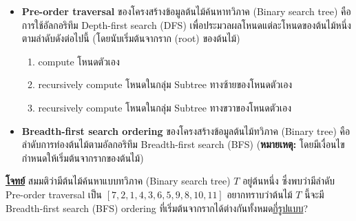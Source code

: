 \begin{itemize}
    \item \textbf{Pre-order traversal}
    ของโครงสร้างข้อมูลต้นไม้ค้นหาทวิภาค (Binary search tree) คือการใช้อัลกอริทึม 
    Depth-first search (DFS) เพื่อประมวลผลโหนดแต่ละโหนดของต้นไม้หนึ่งตามลำดับดังต่อไปนี้ 
    (โดยนับเริ่มต้นจากราก (root) ของต้นไม้)

    \begin{enumerate}
    \item compute โหนดตัวเอง
    \item recursively compute โหนดในกลุ่ม Subtree ทางซ้ายของโหนดตัวเอง
    \item recursively compute โหนดในกลุ่ม Subtree ทางขวาของโหนดตัวเอง
    \end{enumerate}

    \item \textbf{Breadth-first search ordering} 
    ของโครงสร้างข้อมูลต้นไม้ทวิภาค (Binary tree) คือลำดับการท่องต้นไม้ตามอัลกอริทึม 
    Breadth-first search (BFS) (\textbf{หมายเหตุ:} โดยมีเงื่อนไขกำหนดให้เริ่มต้นจากรากของต้นไม้) 
\end{itemize}

\noindent
\textbf{\uline{โจทย์}} สมมติว่ามีต้นไม้ค้นหาแบบทวิภาค (Binary search tree) $T$ อยู่ต้นหนึ่ง
ซึ่งพบว่ามีลำดับ Pre-order traversal เป็น $[\mathrm{7, 2, 1, 4, 3, 6, 5, 9, 8, 10, 11}]$\;
อยากทราบว่าต้นไม้ $T$ นี้จะมี Breadth-first search (BFS) ordering 
ที่เริ่มต้นจากรากได้ต่างกันทั้งหมด\uline{กี่รูปแบบ}?
